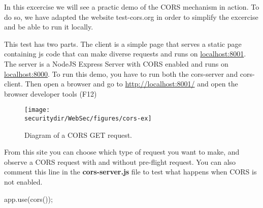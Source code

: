 \begin{Exercise}[label={websec-cors-practs}]
	In this excercise we will see a practic demo of the CORS mechanism in action. To do so, we have adapted the website test-cors.org in order to simplify the excercise and be able to run it locally. 
	
	This test has two parts. The client is a simple page that serves a static page containing js code that can make diverse requests and runs on \url{localhost:8001}. The server is a NodeJS Express Server with CORS enabled and runs on \url{localhost:8000}. To run this demo, you have to run both the cors-server and cors-client. Then open a browser and go to \url{http://localhost:8001/} and open the browser developer tools (F12)
	
\begin{figure}[htb]
    \begin{centering}
      \texttt{[image: \\securitydir/WebSec/figures/cors-ex]}
      \par\end{centering}
    \caption{\label{fig:cors-exc} Diagram of a CORS GET request.}
 \end{figure}
  
	From this site you can choose which type of request you want to make, and observe a CORS request with and without pre-flight request. 
	You can also comment this line in the \textbf{cors-server.js} file to test what happens when CORS is not enabled.
	\begin{js}app.use(cors());\end{js} 

\end{Exercise}

\begin{Answer}[ref={websec-cors-practs}]
\end{Answer}